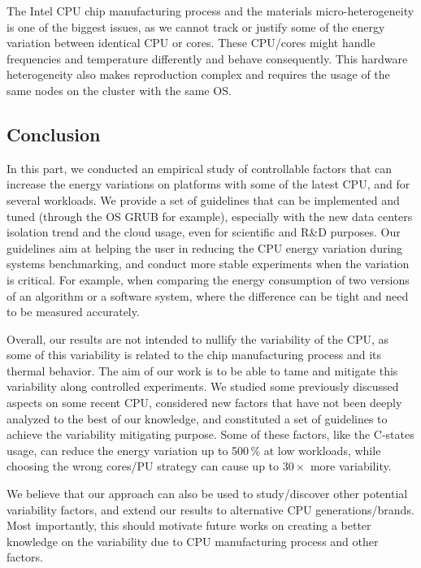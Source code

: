 The Intel CPU chip manufacturing process and the materials micro-heterogeneity is one of the biggest issues, as we cannot track or justify some of the energy variation between identical CPU or cores.
These CPU/cores might handle frequencies and temperature differently and behave consequently.
This hardware heterogeneity also makes reproduction complex and requires the usage of the same nodes on the cluster with the same OS.


\subsection{Conclusion}
In this part, we conducted an empirical study of controllable factors that can increase the energy variations on platforms with some of the latest CPU, and for several workloads.
We provide a set of guidelines that can be implemented and tuned (through the OS GRUB for example), especially with the new data centers isolation trend and the cloud usage, even for scientific and R\&D purposes.
Our guidelines aim at helping the user in reducing the CPU energy variation during systems benchmarking, and conduct more stable experiments when the variation is critical.
For example, when comparing the energy consumption of two versions of an algorithm or a software system, where the difference can be tight and need to be measured accurately.

Overall, our results are not intended to nullify the variability of the CPU, as some of this variability is related to the chip manufacturing process and its thermal behavior.
The aim of our work is to be able to tame and mitigate this variability along controlled experiments.
We studied some previously discussed aspects on some recent CPU, considered new factors that have not been deeply analyzed to the best of our knowledge, and constituted a set of guidelines to achieve the variability mitigating purpose.
Some of these factors, like the C-states usage, can reduce the energy variation up to 500\,\% at low workloads, while choosing the wrong cores/PU strategy can cause up to $30\times$ more variability.

We believe that our approach can also be used to study/discover other potential variability factors, and extend our results to alternative CPU generations/brands.
Most importantly, this should motivate future works on creating a better knowledge on the variability due to CPU manufacturing process and other factors.
